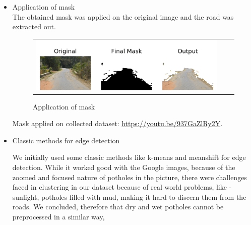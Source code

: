 \documentclass[12pt,a4paper]{article}
\begin{document}
\begin{itemize}
\begin{figure}[!ht]
\begin{center}
\end{center}
\end{figure} 
\newpage

\item Application of mask \\
    The obtained mask was applied on the original image and the road was extracted out. 

\begin{figure}[!ht]
\begin{center}

\begin{tabular}{ccc}
\centering
\includegraphics[width = 5in]{images/output.png}
\end{tabular}
\caption{Application of mask}

\end{center}
\end{figure} 

    Mask applied on collected dataset: \url{https://youtu.be/937GaZlRy2Y}.

    
\item Classic methods for edge detection
 
 We initially used some classic methods like k-means and meanshift for edge detection. While it worked good with the Google images, because of the zoomed and focused nature of potholes in the picture, there were challenges faced in clustering in our dataset because of real world problems,  like - sunlight, potholes filled with mud, making it hard to discern them from the roads. We concluded, therefore that dry and wet potholes cannot be preprocessed in a similar way, 
 
\newpage     
 

\end{itemize}
\end{document}
